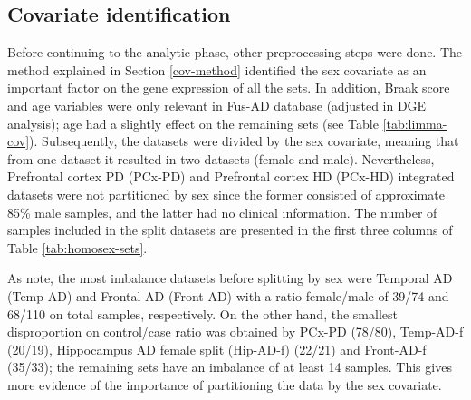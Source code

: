 \subsection{Covariate identification}

Before continuing to the analytic phase, other preprocessing steps were done. The method explained in Section \ref{cov-method} identified the sex covariate as an important factor on the gene expression of all the sets. In addition, Braak score and age variables were only relevant in Fus-AD database (adjusted in DGE analysis); age had a slightly effect on the remaining sets (see Table \ref{tab:limma-cov}). Subsequently, the datasets were divided by the sex covariate, meaning that from one dataset it resulted in two datasets (female and male). Nevertheless, Prefrontal cortex PD (PCx-PD) and Prefrontal cortex HD (PCx-HD) integrated datasets were not partitioned by sex since the former consisted of approximate 85\% male samples, and the latter had no clinical information. The number of samples included in the split datasets are presented in the first three columns of Table \ref{tab:homosex-sets}.

As note, the most imbalance datasets before splitting by sex were Temporal AD (Temp-AD) and Frontal AD (Front-AD) with a ratio female/male of 39/74 and 68/110 on total samples, respectively. On the other hand, the smallest disproportion on control/case ratio was obtained by PCx-PD (78/80), Temp-AD-f (20/19), Hippocampus AD female split (Hip-AD-f) (22/21) and Front-AD-f (35/33); the remaining sets have an imbalance of at least 14 samples. This gives more evidence of the importance of partitioning the data by the sex covariate. 

